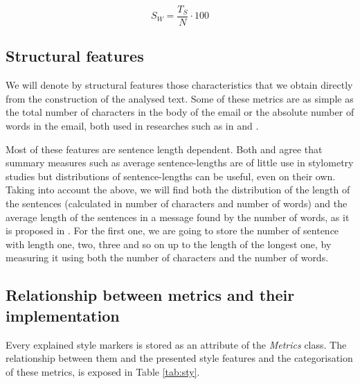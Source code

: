 $$
S_W = \frac{T_S}{N}\cdot 100
$$

\subsection{Structural features}\label{ssect:strucf}

We will denote by structural features those characteristics that we obtain directly from the construction of the analysed text. Some of these metrics are as simple as the total number of characters in the body of the email or the absolute number of words in the email, both used in researches such as in \cite{corney2001identifying} and \cite{ril2014determination}.

Most of these features are sentence length dependent. Both \cite{tallentire1972appraisal} and \cite{kjetsaa1979and} agree that summary measures such as average sentence-lengths are of little use in stylometry studies but distributions of sentence-lengths can be useful, even on their own. Taking into account the above, we will find both the distribution of the length of the sentences (calculated in number of characters and number of words) and the average length of the sentences in a message found by the number of words, as it is proposed in \cite{corney2001identifying}. For the first one, we are going to store the number of sentence with length one, two, three and so on up to the length of the longest one, by measuring it  using both the number of characters and the number of words.

\subsection{Relationship between metrics and their implementation}\label{ssect:relmet}
Every explained style markers is stored as an attribute of the \textit{Metrics} class. The relationship between them and the presented style features and the categorisation of these metrics, is exposed in Table \ref{tab:sty}.

